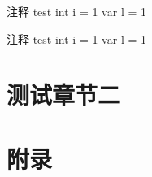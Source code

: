 \documentclass[codepkg=minted,theme=fancy,twoside]{course-report}
\begin{document}
\begin{codebox}{注释 test}\label{box:1.3}
    int i = 1    
    var l = 1
\end{codebox}

\begin{codebox*}{注释 test}
    int i = 1    
    var l = 1
\end{codebox*}

\chapter{测试章节二}



\backmatter

\appendix
\chapter{附录}

\nocite{*}
\end{document}
